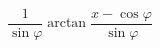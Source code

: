 \begin{displaymath}
 \frac{1}{\sin \varphi}\arctan \frac{x-\cos \varphi}{\sin \varphi}
\end{displaymath}
